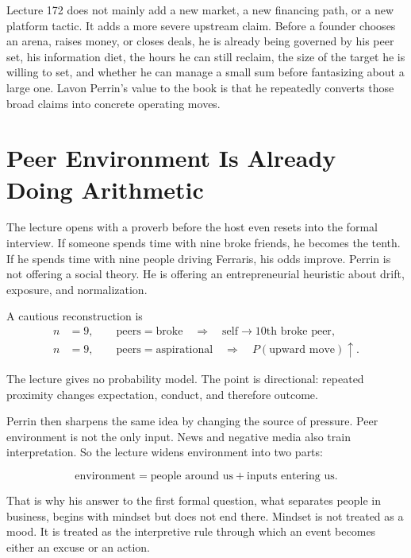 \documentclass[11pt,oneside]{book}
\begin{document}
Lecture 172 does not mainly add a new market, a new financing path, or a new platform tactic. It adds a more severe upstream claim. Before a founder chooses an arena, raises money, or closes deals, he is already being governed by his peer set, his information diet, the hours he can still reclaim, the size of the target he is willing to set, and whether he can manage a small sum before fantasizing about a large one. Lavon Perrin's value to the book is that he repeatedly converts those broad claims into concrete operating moves.

\section{Peer Environment Is Already Doing Arithmetic}

The lecture opens with a proverb before the host even resets into the formal interview. If someone spends time with nine broke friends, he becomes the tenth. If he spends time with nine people driving Ferraris, his odds improve. Perrin is not offering a social theory. He is offering an entrepreneurial heuristic about drift, exposure, and normalization.

A cautious reconstruction is
\begin{align}
n &= 9,\qquad \text{peers}=\text{broke}
\quad \Longrightarrow \quad
\text{self}\to \text{10th broke peer},\\
n &= 9,\qquad \text{peers}=\text{aspirational}
\quad \Longrightarrow \quad
P(\text{upward move})\uparrow .
\end{align}

\begin{remark}
The lecture gives no probability model. The point is directional: repeated proximity changes expectation, conduct, and therefore outcome.
\end{remark}

Perrin then sharpens the same idea by changing the source of pressure. Peer environment is not the only input. News and negative media also train interpretation. So the lecture widens environment into two parts:

\[
\text{environment}
=
\text{people around us}
+
\text{inputs entering us}.
\]

That is why his answer to the first formal question, what separates people in business, begins with mindset but does not end there. Mindset is not treated as a mood. It is treated as the interpretive rule through which an event becomes either an excuse or an action.
\end{document}
